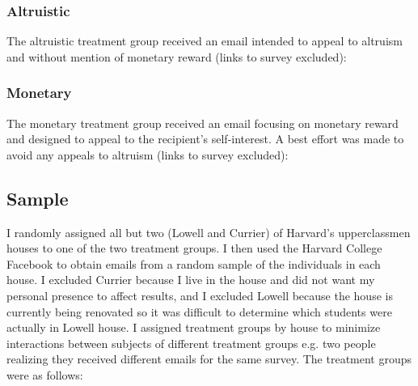 \documentclass[12pt]{article}
\begin{document}
\subsubsection{Altruistic}
The altruistic treatment group received an email intended to appeal to altruism and without mention of monetary reward (links to survey excluded):

\subsubsection{Monetary}
The monetary treatment group received an email focusing on monetary reward and designed to appeal to the recipient's self-interest. A best effort was made to avoid any appeals to altruism (links to survey excluded):


\subsection{Sample}
I randomly assigned all but two (Lowell and Currier) of Harvard's upperclassmen houses to one of the two treatment groups. I then used the Harvard College Facebook to obtain emails from a random sample of the individuals in each house. I excluded Currier because I live in the house and did not want my personal presence to affect results, and I excluded Lowell because the house is currently being renovated so it was difficult to determine which students were actually in Lowell house. I assigned treatment groups by house to minimize interactions between subjects of different treatment groups e.g. two people realizing they received different emails for the same survey. The treatment groups were as follows:
\end{document}
